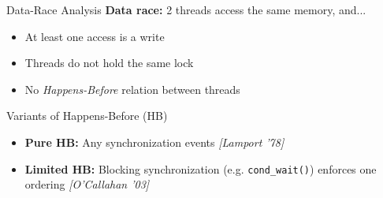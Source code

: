 \documentclass[xcolor=dvipsnames]{beamer}
\begin{document}
\begin{frame}{Data-Race Analysis}
	\textbf{Data race:} 2 threads access the same memory, and...
	\begin{itemize}
		\item At least one access is a write
		\item Threads do not hold the same lock
		\item No {\em Happens-Before} relation between threads
	\end{itemize}
	\pause
	\linegap

	Variants of Happens-Before (HB)
	\begin{itemize}
		\item {\bf Pure HB:} Any synchronization events {\em [Lamport '78]}
		\item {\bf Limited HB:} Blocking synchronization (e.g. \texttt{cond\_wait()}) enforces one ordering {\em [O'Callahan '03]}
	\end{itemize}
\end{frame}
\end{document}
